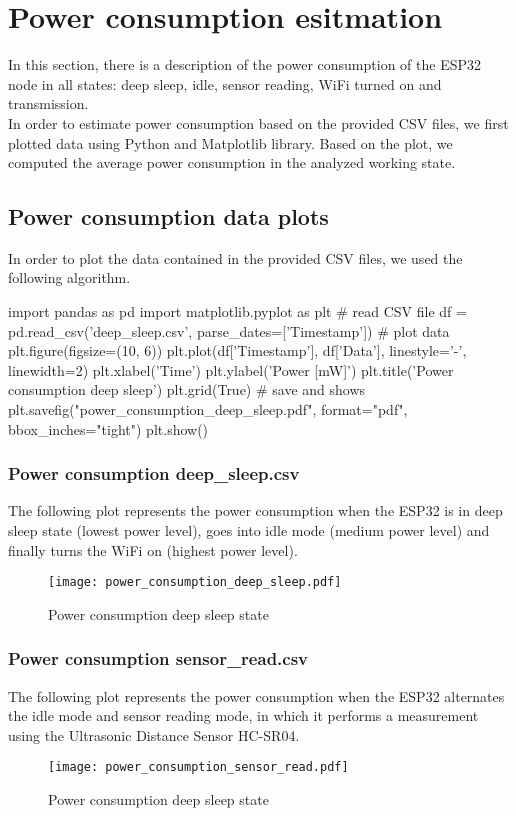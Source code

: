 \section{Power consumption esitmation}
In this section, there is a description of the power consumption of the ESP32 node in all states: deep sleep, idle, sensor reading, WiFi turned on and transmission.\\
In order to estimate power consumption based on the provided CSV files, we first plotted data using Python and Matplotlib library. Based on the plot, we computed the average power consumption in the analyzed working state.

\subsection{Power consumption data plots}
In order to plot the data contained in the provided CSV files, we used the following algorithm.

\begin{python}
import pandas as pd
import matplotlib.pyplot as plt
# read CSV file 
df = pd.read_csv('deep_sleep.csv', parse_dates=['Timestamp'])
# plot data
plt.figure(figsize=(10, 6))
plt.plot(df['Timestamp'], df['Data'], linestyle='-', linewidth=2)
plt.xlabel('Time')
plt.ylabel('Power [mW]')
plt.title('Power consumption deep sleep')
plt.grid(True)
# save and shows
plt.savefig("power_consumption_deep_sleep.pdf", format="pdf", bbox_inches="tight")
plt.show()
\end{python}

\subsubsection{Power consumption deep\_sleep.csv}
The following plot represents the power consumption when the ESP32 is in deep sleep state (lowest power level), goes into idle mode (medium power level) and finally turns the WiFi on (highest power level). 
\begin{figure}[H]
    \centering
    \texttt{[image: power\_consumption\_deep\_sleep.pdf]}
    \caption{Power consumption deep sleep state}
    \label{fig:Power consumption deep sleep state}
\end{figure}

\subsubsection{Power consumption sensor\_read.csv}
The following plot represents the power consumption when the ESP32 alternates the idle mode and sensor reading mode, in which it performs a measurement using the Ultrasonic Distance Sensor HC-SR04.
\begin{figure}[H]
    \centering
    \texttt{[image: power\_consumption\_sensor\_read.pdf]}
    \caption{Power consumption deep sleep state}
    \label{fig:Power consumption deep sleep state}
\end{figure}

